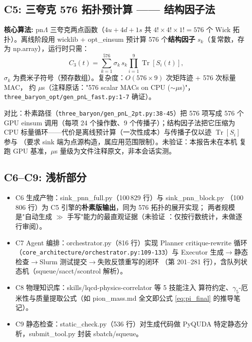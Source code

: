 \documentclass[UTF8]{ctexart}
\begin{document}
\subsection{C5: 三夸克 576 拓扑预计算 —— 结构因子法}
\begin{algobox}
\textbf{核心算法:} pn$\Lambda$ 三夸克两点函数（$4u+4d+1s$ 共 $4!\times4!\times1!=576$ 个
Wick 拓扑）。离线阶段用 wicklib + opt\_einsum 预计算 576 个\textbf{结构因子}
$s_k$（复常数，存为 np.array），运行时只需：
\begin{equation}\label{eq:struct}
C_3(t)=\sum_{k=1}^{576} \sigma_k\,s_k\prod_{i=1}^{9}\operatorname{Tr}[S_i(t)],
\end{equation}
$\sigma_k$ 为费米子符号（预存数组）。复杂度：$O(576\times 9)$ 次矩阵迹 + 576 次标量 MAC，
约 $\mu$s（注释原话："576 scalar MACs on CPU ($\sim\mu$s)"，
\nolinkurl{three_baryon_opt/gen_pnL_fast.py:1-7} 确证）。
\end{algobox}


\textcolor{warn}{对比}：朴素路径（\nolinkurl{three_baryon/gen_pnL_2pt.py:38-45}）把 576
项写成 576 个 GPU einsum 调用（每项 24 个操作数、9 个传播子）；结构因子法把它压缩为
CPU 标量循环——代价是离线预计算（一次性成本）与传播子仅以迹 $\operatorname{Tr}[S_i]$ 参与
（要求 sink 端为点源构造，属应用范围限制）。\textcolor{warn}{未验证}：本报告未在本机
复跑 GPU 基准，$\mu$s 量级为文件注释原文，非本会话实测。

\subsection{C6--C9: 浅析部分}
\begin{itemize}
\item \textcolor{algo}{C6 生成产物}：sink\_pnn\_full.py（100\,829 行）与 sink\_pnn\_block.py
（100\,806 行）为 C5 引擎的\textbf{朴素版输出}，同为 576 拓扑的展开实现；
两者规模是"自动生成 $\gg$ 手写"能力的最直观证据（\textcolor{warn}{未验证}
：仅按行数统计，未做逐行审阅）。
\item \textcolor{algo}{C7 Agent 编排}：orchestrator.py（816 行）实现 Planner critique-rewrite
循环（\nolinkurl{core_architecture/orchestrator.py:109-133}）与 Executor
生成$\to$静态检查$\to$Slurm 测试提交$\to$失败反馈重写的闭环
（第 201--281 行），含队列状态机（squeue/sacct/scontrol 解析）。
\item \textcolor{algo}{C8 物理知识库}：skills/lqcd-physics-correlator 等 5 技能注入
算符约定、$\gamma_5$-厄米性与质量提取公式（如 pion\_mass.md 全文即公式 \eqref{eq:pi_final}
的推导笔记）。
\item \textcolor{algo}{C9 静态检查}：static\_check.py（536 行）对生成代码做
PyQUDA 特定静态分析，submit\_tool.py 封装 sbatch/squeue。
\end{itemize}
\end{document}
